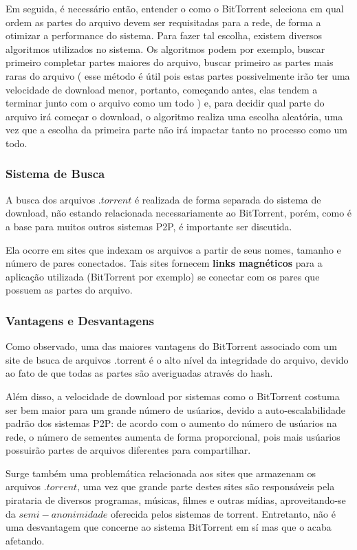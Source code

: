 \documentclass[a4paper]{article}
\begin{document}
Em seguida, é necessário então, entender o como o BitTorrent seleciona em qual ordem as partes do arquivo devem ser requisitadas para a rede, de forma a otimizar a performance do sistema. Para fazer tal escolha, existem diversos algoritmos utilizados no sistema. Os algoritmos podem por exemplo, buscar primeiro completar partes maiores do arquivo, buscar primeiro as partes mais raras do arquivo ( esse método é útil pois estas partes possivelmente irão ter uma velocidade de download menor, portanto, começando antes, elas tendem a terminar junto com o arquivo como um todo ) e, para decidir qual parte do arquivo irá começar o download, o algoritmo realiza uma escolha aleatória, uma vez que a escolha da primeira parte não irá impactar tanto no processo como um todo.\cite{CohenBIT}  
\subsubsection{Sistema de Busca}
A busca dos arquivos $.torrent$ é realizada de forma separada do sistema de download, não estando relacionada necessariamente ao BitTorrent, porém, como é a base para muitos outros sistemas P2P, é importante ser discutida.

Ela ocorre em sites que indexam os arquivos a partir de seus nomes, tamanho e número de pares conectados. Tais sites fornecem \textbf{links magnéticos} para a aplicação utilizada (BitTorrent por exemplo) se conectar com os pares que possuem as partes do arquivo. 

\subsubsection{Vantagens e Desvantagens}
Como observado, uma das maiores vantagens do BitTorrent associado com um site de bsuca de arquivos .torrent é o alto nível da integridade do arquivo, devido ao fato de que todas as partes são averiguadas através do hash\cite{CohenBIT}.

Além disso, a velocidade de download por sistemas como o BitTorrent costuma ser bem maior para um grande número de usúarios, devido a auto-escalabilidade padrão dos sistemas P2P: de acordo com o aumento do número de usúarios na rede, o número de sementes aumenta de forma proporcional, pois mais usúarios possuirão partes de arquivos diferentes para compartilhar.\cite{pouwelsebit}

Surge também uma problemática relacionada aos sites que armazenam os arquivos $.torrent$, uma vez que grande parte destes sites são responsáveis pela pirataria de diversos programas, músicas, filmes e outras mídias, aproveitando-se da $semi-anonimidade$ oferecida pelos sistemas de torrent. Entretanto, não é uma desvantagem que concerne ao sistema BitTorrent em sí mas que o acaba afetando.
\end{document}
